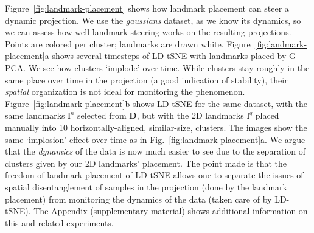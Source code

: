 Figure~\ref{fig:landmark-placement} shows how landmark placement can steer a dynamic projection. We use the \emph{gaussians} dataset, as we know its dynamics, so we can assess how well landmark steering works on the resulting projections. Points are colored per cluster; landmarks are drawn white. Figure~\ref{fig:landmark-placement}a shows several timesteps of LD-tSNE with landmarks placed by G-PCA. We see how clusters `implode' over time. While clusters stay roughly in the same place over time in the projection (a good indication of stability), their \emph{spatial} organization is not ideal for monitoring the phenomenon. Figure~\ref{fig:landmark-placement}b shows LD-tSNE for the same dataset, with the same landmarks $\mathbf{l}^n$ selected from $\mathbf{D}$, but with the 2D landmarks $\mathbf{l}^q$ placed manually into 10 horizontally-aligned, similar-size, clusters. The images show the same `implosion' effect over time as in Fig.~\ref{fig:landmark-placement}a. We argue that the \emph{dynamics} of the data is now much easier to see due to the separation of clusters given by our 2D landmarks' placement. The point made is that the freedom of landmark placement of LD-tSNE allows one to separate the issues of spatial disentanglement of samples in the projection (done by the landmark placement) from monitoring the dynamics of the data (taken care of by LD-tSNE). The Appendix (supplementary material) shows additional information on this and related experiments.




